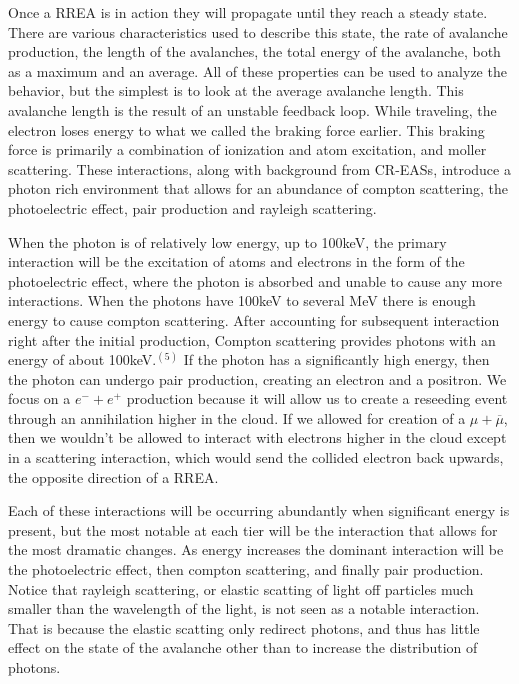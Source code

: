 \documentclass[11pt]{article}
\begin{document}
\begin{multicols*}{2}
    Once a RREA is in action they will propagate until they reach a steady state. There are various characteristics used to describe this state, the rate of avalanche production, the length of the avalanches, the total energy of the avalanche, both as a maximum and an average. All of these properties can be used to analyze the behavior, but the simplest is to look at the average avalanche length. This avalanche length is the result of an unstable feedback loop. While traveling, the electron loses energy to what we called the braking force earlier. This braking force is primarily a combination of ionization and atom excitation, and moller scattering. These interactions, along with background from CR-EASs, introduce a photon rich environment that allows for an abundance of compton scattering, the photoelectric effect, pair production and rayleigh scattering. 
    
    When the photon is of relatively low energy, up to 100keV, the primary interaction will be the excitation of atoms and electrons in the form of the photoelectric effect, where the photon is absorbed and unable to cause any more interactions. When the photons have 100keV to several MeV there is enough energy to cause compton scattering. After accounting for subsequent interaction right after the initial production, Compton scattering provides photons with an energy of about 100keV.$^{(5)}$ If the photon has a significantly high energy, then the photon can undergo pair production, creating an electron and a positron. We focus on a $e^- + e^+$ production because it will allow us to create a reseeding event through an annihilation higher in the cloud. If we allowed for creation of a $\mu + \overline{\mu}$, then we wouldn't be allowed to interact with electrons higher in the cloud except in a scattering interaction, which would send the collided electron back upwards, the opposite direction of a RREA.
    
    Each of these interactions will be occurring abundantly when significant energy is present, but the most notable at each tier will be the interaction that allows for the most dramatic changes. As energy increases the dominant interaction will be the photoelectric effect, then compton scattering, and finally pair production. Notice that rayleigh scattering, or elastic scatting of light off particles much smaller than the wavelength of the light, is not seen as a notable interaction. That is because the elastic scatting only redirect photons, and thus has little effect on the state of the avalanche other than to increase the distribution of photons. 
    

\end{multicols*}
\end{document}
